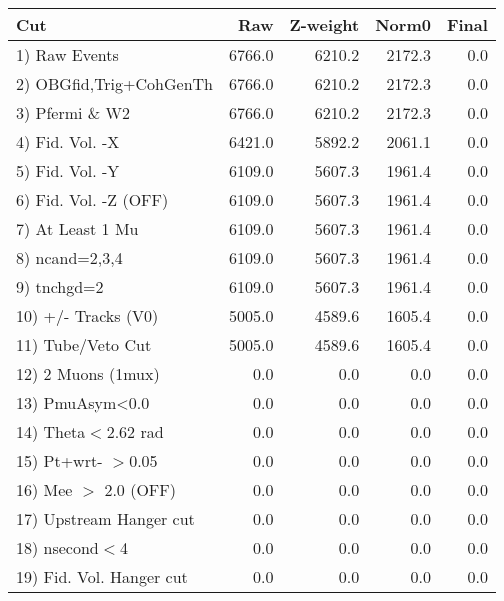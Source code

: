  \begin{table}[h!]\centering
 \begin{tabular}{||l||r|r|r|r||}
 \hline
 \hline
 Cut & Raw & Z-weight & Norm0 & Final \\
 \hline
  1) Raw Events           &      6766.0 &      6210.2 &      2172.3 &         0.0 \\
  2) OBGfid,Trig+CohGenTh &      6766.0 &      6210.2 &      2172.3 &         0.0 \\
  3) Pfermi \& W2         &      6766.0 &      6210.2 &      2172.3 &         0.0 \\
  4) Fid. Vol. -X         &      6421.0 &      5892.2 &      2061.1 &         0.0 \\
  5) Fid. Vol. -Y         &      6109.0 &      5607.3 &      1961.4 &         0.0 \\
  6) Fid. Vol. -Z (OFF)   &      6109.0 &      5607.3 &      1961.4 &         0.0 \\
  7) At Least 1 Mu        &      6109.0 &      5607.3 &      1961.4 &         0.0 \\
  8) ncand=2,3,4          &      6109.0 &      5607.3 &      1961.4 &         0.0 \\
  9) tnchgd=2             &      6109.0 &      5607.3 &      1961.4 &         0.0 \\
 10) +/- Tracks (V0)      &      5005.0 &      4589.6 &      1605.4 &         0.0 \\
 11) Tube/Veto Cut        &      5005.0 &      4589.6 &      1605.4 &         0.0 \\
 12) 2 Muons (1mux)       &         0.0 &         0.0 &         0.0 &         0.0 \\
 13) PmuAsym<0.0          &         0.0 &         0.0 &         0.0 &         0.0 \\
 14) Theta$<$2.62 rad     &         0.0 &         0.0 &         0.0 &         0.0 \\
 15) Pt+wrt- $>$0.05      &         0.0 &         0.0 &         0.0 &         0.0 \\
 16) Mee $>$ 2.0  (OFF)   &         0.0 &         0.0 &         0.0 &         0.0 \\
 17) Upstream Hanger cut  &         0.0 &         0.0 &         0.0 &         0.0 \\
 18) nsecond$<$4          &         0.0 &         0.0 &         0.0 &         0.0 \\
 19) Fid. Vol. Hanger cut &         0.0 &         0.0 &         0.0 &         0.0 \\

\end{tabular}
\end{table}
